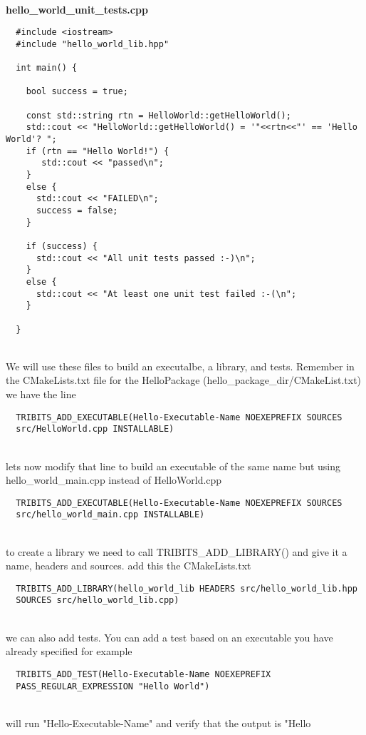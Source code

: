 \documentclass[12pt]{article}
\begin{document}
\textbf{\\hello\_world\_unit\_tests.cpp}
\begin{verbatim}
  #include <iostream>
  #include "hello_world_lib.hpp"
  
  int main() {
  
    bool success = true;
  
    const std::string rtn = HelloWorld::getHelloWorld();
    std::cout << "HelloWorld::getHelloWorld() = '"<<rtn<<"' == 'Hello World'? ";
    if (rtn == "Hello World!") {
       std::cout << "passed\n";
    }
    else {
      std::cout << "FAILED\n";
      success = false;
    }
  
    if (success) {
      std::cout << "All unit tests passed :-)\n";
    }
    else {
      std::cout << "At least one unit test failed :-(\n";
    }
  
  }
\end{verbatim}\\
We will use these files to build an executalbe, a library, and tests.
Remember in the CMakeLists.txt file for the HelloPackage
(hello\_package\_dir/CMakeList.txt) we have the line
\begin{verbatim}
  TRIBITS_ADD_EXECUTABLE(Hello-Executable-Name NOEXEPREFIX SOURCES
  src/HelloWorld.cpp INSTALLABLE)
\end{verbatim}\\
lets now modify that line to build an executable of the same name but
using hello\_world\_main.cpp instead of HelloWorld.cpp
\begin{verbatim}
  TRIBITS_ADD_EXECUTABLE(Hello-Executable-Name NOEXEPREFIX SOURCES
  src/hello_world_main.cpp INSTALLABLE)
\end{verbatim}\\
to create a library we need to call TRIBITS\_ADD\_LIBRARY() and give it
a name, headers and sources.  add this the CMakeLists.txt
\begin{verbatim}
  TRIBITS_ADD_LIBRARY(hello_world_lib HEADERS src/hello_world_lib.hpp
  SOURCES src/hello_world_lib.cpp)
\end{verbatim}\\
we can also add tests.  You can add a test based on an executable you
have already specified for example
\begin{verbatim}
  TRIBITS_ADD_TEST(Hello-Executable-Name NOEXEPREFIX
  PASS_REGULAR_EXPRESSION "Hello World")
\end{verbatim}\\
will run "Hello-Executable-Name" and verify that the output is "Hello
\end{document}
